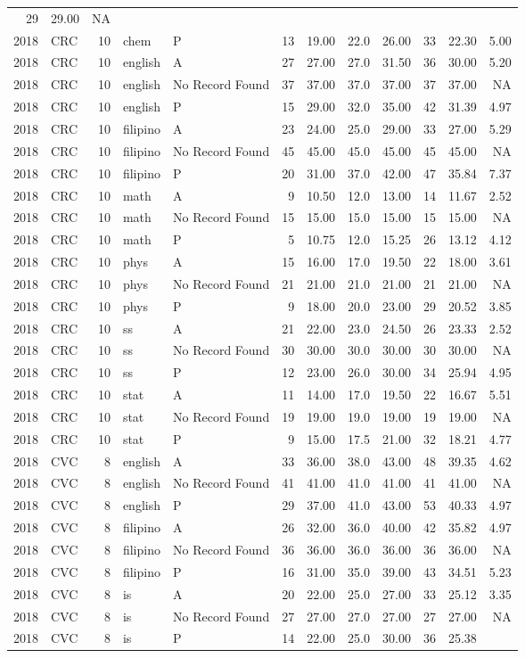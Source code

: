 \documentclass[]{article}
\begin{document}
\begin{longtable}[]{@{}rlrllrrrrrrr@{}}
29 & 29.00 & NA\tabularnewline
2018 & CRC & 10 & chem & P & 13 & 19.00 & 22.0 & 26.00 & 33 & 22.30 &
5.00\tabularnewline
2018 & CRC & 10 & english & A & 27 & 27.00 & 27.0 & 31.50 & 36 & 30.00 &
5.20\tabularnewline
2018 & CRC & 10 & english & No Record Found & 37 & 37.00 & 37.0 & 37.00
& 37 & 37.00 & NA\tabularnewline
2018 & CRC & 10 & english & P & 15 & 29.00 & 32.0 & 35.00 & 42 & 31.39 &
4.97\tabularnewline
2018 & CRC & 10 & filipino & A & 23 & 24.00 & 25.0 & 29.00 & 33 & 27.00
& 5.29\tabularnewline
2018 & CRC & 10 & filipino & No Record Found & 45 & 45.00 & 45.0 & 45.00
& 45 & 45.00 & NA\tabularnewline
2018 & CRC & 10 & filipino & P & 20 & 31.00 & 37.0 & 42.00 & 47 & 35.84
& 7.37\tabularnewline
2018 & CRC & 10 & math & A & 9 & 10.50 & 12.0 & 13.00 & 14 & 11.67 &
2.52\tabularnewline
2018 & CRC & 10 & math & No Record Found & 15 & 15.00 & 15.0 & 15.00 &
15 & 15.00 & NA\tabularnewline
2018 & CRC & 10 & math & P & 5 & 10.75 & 12.0 & 15.25 & 26 & 13.12 &
4.12\tabularnewline
2018 & CRC & 10 & phys & A & 15 & 16.00 & 17.0 & 19.50 & 22 & 18.00 &
3.61\tabularnewline
2018 & CRC & 10 & phys & No Record Found & 21 & 21.00 & 21.0 & 21.00 &
21 & 21.00 & NA\tabularnewline
2018 & CRC & 10 & phys & P & 9 & 18.00 & 20.0 & 23.00 & 29 & 20.52 &
3.85\tabularnewline
2018 & CRC & 10 & ss & A & 21 & 22.00 & 23.0 & 24.50 & 26 & 23.33 &
2.52\tabularnewline
2018 & CRC & 10 & ss & No Record Found & 30 & 30.00 & 30.0 & 30.00 & 30
& 30.00 & NA\tabularnewline
2018 & CRC & 10 & ss & P & 12 & 23.00 & 26.0 & 30.00 & 34 & 25.94 &
4.95\tabularnewline
2018 & CRC & 10 & stat & A & 11 & 14.00 & 17.0 & 19.50 & 22 & 16.67 &
5.51\tabularnewline
2018 & CRC & 10 & stat & No Record Found & 19 & 19.00 & 19.0 & 19.00 &
19 & 19.00 & NA\tabularnewline
2018 & CRC & 10 & stat & P & 9 & 15.00 & 17.5 & 21.00 & 32 & 18.21 &
4.77\tabularnewline
2018 & CVC & 8 & english & A & 33 & 36.00 & 38.0 & 43.00 & 48 & 39.35 &
4.62\tabularnewline
2018 & CVC & 8 & english & No Record Found & 41 & 41.00 & 41.0 & 41.00 &
41 & 41.00 & NA\tabularnewline
2018 & CVC & 8 & english & P & 29 & 37.00 & 41.0 & 43.00 & 53 & 40.33 &
4.97\tabularnewline
2018 & CVC & 8 & filipino & A & 26 & 32.00 & 36.0 & 40.00 & 42 & 35.82 &
4.97\tabularnewline
2018 & CVC & 8 & filipino & No Record Found & 36 & 36.00 & 36.0 & 36.00
& 36 & 36.00 & NA\tabularnewline
2018 & CVC & 8 & filipino & P & 16 & 31.00 & 35.0 & 39.00 & 43 & 34.51 &
5.23\tabularnewline
2018 & CVC & 8 & is & A & 20 & 22.00 & 25.0 & 27.00 & 33 & 25.12 &
3.35\tabularnewline
2018 & CVC & 8 & is & No Record Found & 27 & 27.00 & 27.0 & 27.00 & 27 &
27.00 & NA\tabularnewline
2018 & CVC & 8 & is & P & 14 & 22.00 & 25.0 & 30.00 & 36 & 25.38 &

\end{longtable}
\end{document}
